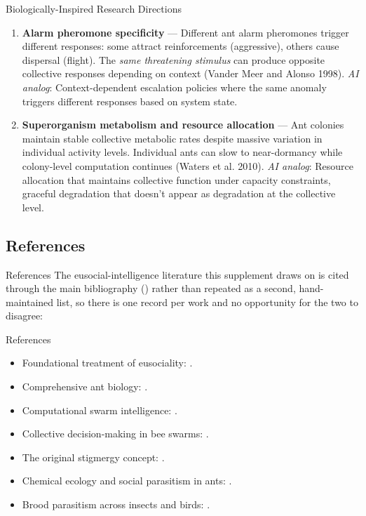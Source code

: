 \documentclass[
  ignorenonframetext,
]{beamer}
\providecommand{\tightlist}{%
  \setlength{\itemsep}{0pt}\setlength{\parskip}{0pt}}
\providecommand{\cref}[1]{\texttt{\detokenize{#1}}}
\begin{document}
\begin{frame}[allowframebreaks]{Biologically-Inspired Research
Directions}
\begin{enumerate}
  gradual adversarial drift of agent acceptance thresholds (cognitive
  boiling frog)?
\item
  \textbf{Alarm pheromone specificity} --- Different ant alarm
  pheromones trigger different responses: some attract reinforcements
  (aggressive), others cause dispersal (flight). The \emph{same
  threatening stimulus} can produce opposite collective responses
  depending on context (Vander Meer and Alonso 1998). \emph{AI analog}:
  Context-dependent escalation policies where the same anomaly triggers
  different responses based on system state.
\item
  \textbf{Superorganism metabolism and resource allocation} --- Ant
  colonies maintain stable collective metabolic rates despite massive
  variation in individual activity levels. Individual ants can slow to
  near-dormancy while colony-level computation continues (Waters et al.
  2010). \emph{AI analog}: Resource allocation that maintains collective
  function under capacity constraints, graceful degradation that doesn't
  appear as degradation at the collective level.
\end{enumerate}
\end{frame}

\begin{frame}
\end{frame}

\subsection{References}\label{sec:eusocial-references}

\begin{frame}[allowframebreaks]{References}
The eusocial-intelligence literature this supplement draws on is cited
through the main bibliography (\cref{sec:references}) rather than
repeated as a second, hand-maintained list, so there is one record per
work and no opportunity for the two to disagree:

\end{frame}

\begin{frame}[allowframebreaks]{References}
\begin{itemize}
\tightlist
\item
  Foundational treatment of eusociality: \cite{wilson1971insect}.
\item
  Comprehensive ant biology: \cite{holldobler1990ants}.
\item
  Computational swarm intelligence: \cite{bonabeau1999swarm}.
\item
  Collective decision-making in bee swarms: \cite{seeley2010honeybee}.
\item
  The original stigmergy concept: \cite{grasse1959reconstruction}.
\item
  Chemical ecology and social parasitism in ants:
  \cite{lenoir2001chemical}.
\item
  Brood parasitism across insects and birds: \cite{kilner2011cuckoos}.
\end{itemize}
\end{frame}
\end{document}
